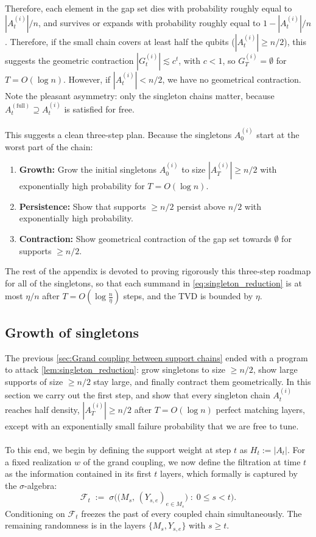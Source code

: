 \documentclass[
    aps,
    superscriptaddress,
    onecolumn,
    10pt,
    prx,
    nofootinbib
]{revtex4-2}
\theoremstyle{namedstatement}
\theoremstyle{plain}
\begin{document}
Therefore, each element in the gap set dies with probability roughly equal to $|A_t^{(i)}|/n$, and survives or expands with probability roughly equal to $1-|A_t^{(i)}|/n$. Therefore, if the small chain covers at least half the qubits ($|A_t^{(i)}|\geq n/2$), this suggests the geometric contraction $|G_t^{(i)}| \lesssim c^t$, with $c<1$, so $G_T^{(i)}=\emptyset$ for $T=O(\log n)$. However, if $|A_t^{(i)}|<n/2$, we have no geometrical contraction. Note the pleasant asymmetry: only the singleton chains matter, because $A_t^{(\mathrm{full})} \supseteq A_t^{(i)}$ is satisfied for free.
\\
\\
This suggests a clean three-step plan. Because the singletons $A_0^{(i)}$ start at the worst part of the chain:
\begin{enumerate}
    \item \textbf{Growth:} Grow the initial singletons $A_0^{(i)}$ to size $|A_T^{(i)}|\geq n/2$ with exponentially high probability for $T=O(\log n)$.
    \item \textbf{Persistence:} Show that supports $\geq n/2$ persist above $n/2$ with exponentially high probability.
    \item \textbf{Contraction:} Show geometrical contraction of the gap set towards $\emptyset$ for supports $\geq n/2$.
\end{enumerate}
The rest of the appendix is devoted to proving rigorously this three-step roadmap for all of the singletons, so that each summand in \cref{eq:singleton_reduction} is at most $\eta/n$ after $T = O(\log \tfrac{n}{\eta})$ steps, and the TVD is bounded by $\eta$.



\newpage


\subsection{Growth of singletons}
\label{sec:growth}

The previous \cref{sec:Grand coupling between support chains} ended with a program to attack \cref{lem:singleton_reduction}: grow singletons to size $\geq n/2$, show large supports of size $\geq n/2$ stay large, and finally contract them geometrically. In this section we carry out the first step, and show that every singleton chain $A^{(i)}_t$ reaches half density, $|A_T^{(i)}|\ge n/2$ after $T=O(\log n)$ perfect matching layers, except with an exponentially small failure probability that we are free to tune.
\\
\\
To this end, we begin by defining the support weight at step $t$ as $H_t:=|A_t|$. For a fixed realization $w$ of the grand coupling, we now define the filtration at time $t$ as the information contained in its first $t$ layers, which formally is captured by the $\sigma$-algebra:
\begin{equation}\label{eq:filtration}
  \mathcal F_t \;:=\; \sigma\Big(\big(M_s,\,(Y_{s,e})_{e\in M_s}\big)\;:\;0\le s<t\Big).
\end{equation}
Conditioning on $\mathcal F_t$ freezes the past of every coupled chain simultaneously. The remaining randomness is in the layers $\{M_s,Y_{s,e}\}$ with $s\geq t$.
\end{document}
